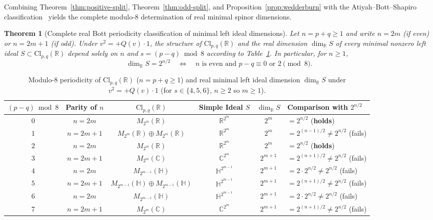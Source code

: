 \documentclass[11pt,a4paper]{article}
\theoremstyle{plain}
\newtheorem{theorem}{Theorem}[section]
\theoremstyle{definition}
\theoremstyle{remark}
\newcommand{\Cl}{\mathrm{Cl}}
\begin{document}
Combining Theorem~\ref{thm:positive-split}, Theorem~\ref{thm:odd-split}, and Proposition~\ref{prop:wedderburn} with the Atiyah--Bott--Shapiro classification~\cite{AtiyahBottShapiro1964} yields the complete modulo-$8$ determination of real minimal spinor dimensions.

\begin{theorem}[Complete real Bott periodicity classification of minimal left ideal dimensions]\label{thm:bott}
Let $n = p + q \ge 1$ and write $n = 2m$ (if even) or $n = 2m + 1$ (if odd). Under $v^2 = +Q(v)\cdot 1$, the structure of $\Cl_{p,q}(\mathbb{R})$ and the real dimension $\dim_{\mathbb{R}} S$ of every minimal nonzero left ideal $S \subset \Cl_{p,q}(\mathbb{R})$ depend solely on $n$ and $s = (p - q) \bmod 8$ according to Table~\ref{tab:bott}. In particular, for $n \ge 1$,
\[
  \dim_{\mathbb{R}} S = 2^{n/2} \quad \Longleftrightarrow \quad n \text{ is even and } p - q \equiv 0 \text{ or } 2 \pmod{8}.
\]
\end{theorem}

\begin{table}[ht]
\centering
\footnotesize
\setlength{\tabcolsep}{4.5pt}
\renewcommand{\arraystretch}{1.22}
\begin{tabular}{@{}cccccl@{}}
\hline
$(p-q)\bmod 8$ & Parity of $n$ & $\Cl_{p,q}(\mathbb{R})$ & Simple Ideal $S$ & $\dim_{\mathbb{R}} S$ & Comparison with $2^{n/2}$ \\
\hline
$0$ & $n = 2m$ & $M_{2^m}(\mathbb{R})$ & $\mathbb{R}^{2^m}$ & $2^m$ & $= 2^{n/2}$ (\textbf{holds}) \\
$1$ & $n = 2m{+}1$ & $M_{2^m}(\mathbb{R}) \oplus M_{2^m}(\mathbb{R})$ & $\mathbb{R}^{2^m}$ & $2^m$ & $= 2^{(n-1)/2} \neq 2^{n/2}$ (fails) \\
$2$ & $n = 2m$ & $M_{2^m}(\mathbb{R})$ & $\mathbb{R}^{2^m}$ & $2^m$ & $= 2^{n/2}$ (\textbf{holds}) \\
$3$ & $n = 2m{+}1$ & $M_{2^m}(\mathbb{C})$ & $\mathbb{C}^{2^m}$ & $2^{m+1}$ & $= 2^{(n+1)/2} \neq 2^{n/2}$ (fails) \\
$4$ & $n = 2m$ & $M_{2^{m-1}}(\mathbb{H})$ & $\mathbb{H}^{2^{m-1}}$ & $2^{m+1}$ & $= 2 \cdot 2^{n/2} \neq 2^{n/2}$ (fails) \\
$5$ & $n = 2m{+}1$ & $M_{2^{m-1}}(\mathbb{H}) \oplus M_{2^{m-1}}(\mathbb{H})$ & $\mathbb{H}^{2^{m-1}}$ & $2^{m+1}$ & $= 2^{(n+1)/2} \neq 2^{n/2}$ (fails) \\
$6$ & $n = 2m$ & $M_{2^{m-1}}(\mathbb{H})$ & $\mathbb{H}^{2^{m-1}}$ & $2^{m+1}$ & $= 2 \cdot 2^{n/2} \neq 2^{n/2}$ (fails) \\
$7$ & $n = 2m{+}1$ & $M_{2^m}(\mathbb{C})$ & $\mathbb{C}^{2^m}$ & $2^{m+1}$ & $= 2^{(n+1)/2} \neq 2^{n/2}$ (fails) \\
\hline
\end{tabular}
\caption{Modulo-$8$ periodicity of $\Cl_{p,q}(\mathbb{R})$ ($n = p + q \ge 1$) and real minimal left ideal dimension $\dim_{\mathbb{R}} S$ under $v^2 = +Q(v)\cdot 1$ (for $s \in \{4,5,6\}$, $n \ge 2$ so $m \ge 1$).}
\label{tab:bott}
\end{table}
\end{document}
